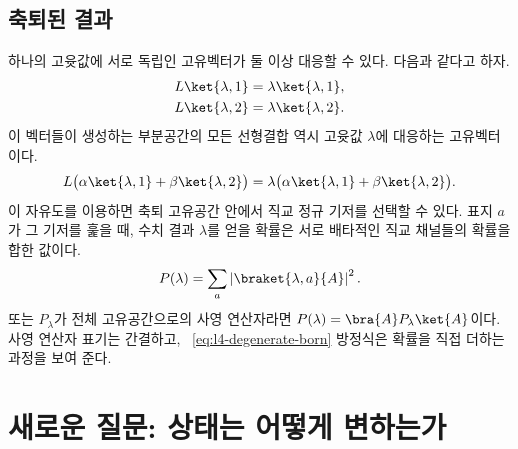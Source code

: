 \subsection{축퇴된 결과}

하나의 고윳값에 서로 독립인 고유벡터가 둘 이상 대응할 수 있다. 다음과 같다고 하자. \begin{align}
L\ket{\lambda,1}&=\lambda\ket{\lambda,1},\\
L\ket{\lambda,2}&=\lambda\ket{\lambda,2}.
\end{align}이 벡터들이 생성하는 부분공간의 모든 선형결합 역시 고윳값 \(\lambda\)에 대응하는 고유벡터이다. \begin{equation}
L\bigl(\alpha\ket{\lambda,1}+\beta\ket{\lambda,2}\bigr)
=
\lambda\bigl(\alpha\ket{\lambda,1}+\beta\ket{\lambda,2}\bigr).
\end{equation}이 자유도를 이용하면 축퇴 고유공간 안에서 직교 정규 기저를 선택할 수 있다. 표지 \(a\)가 그 기저를 훑을 때, 수치 결과 \(\lambda\)를 얻을 확률은 서로 배타적인 직교 채널들의 확률을 합한 값이다. \begin{equation}
P(\lambda)=\sum_a\left|\braket{\lambda,a}{A}\right|^2.
\label{eq:l4-degenerate-born}
\end{equation}또는 \(P_\lambda\)가 전체 고유공간으로의 사영 연산자라면 \(P(\lambda)=\bra{A}P_\lambda\ket{A}\)이다. 사영 연산자 표기는 간결하고, ~\eqref{eq:l4-degenerate-born} 방정식은 확률을 직접 더하는 과정을 보여 준다.

\begin{classroomqa}\end{classroomqa}

\begin{classroomqa}\end{classroomqa}

\section{새로운 질문: 상태는 어떻게 변하는가}

